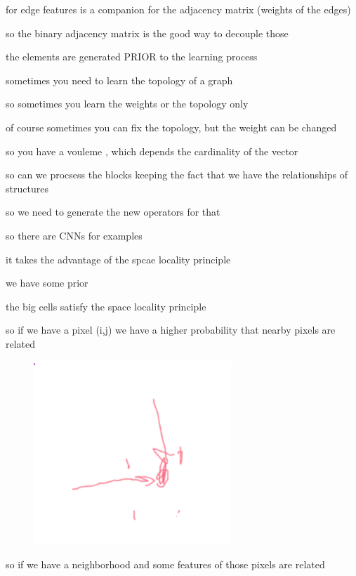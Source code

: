 \documentclass{article}
\begin{document}
for edge features is a companion for the adjacency matrix (weights of the edges)

so the binary adjacency matrix is the good way to decouple those 

the elements are generated PRIOR to the learning process

sometimes you need to learn the topology of a graph

so sometimes you learn the weights or the topology only 

of course sometimes you can fix the topology, but the weight can be changed

so you have a vouleme , which depends the cardinality of the vector

so can we procsess the blocks keeping the fact that we have the relationships of structures

so we need to generate the new operators for that


so there are CNNs for examples

it takes the advantage of the spcae locality principle

we have some prior 

the big cells satisfy the space locality principle

so if we have a pixel (i,j) we have a higher probability that nearby pixels are related

\begin{figure}
	\centering
	\includegraphics[width=0.7\linewidth]{"../imgs/concrete pixel"}
	\caption[Concrete \(i,j\) pixel selection]{}
	\label{fig:concrete-pixel}
\end{figure}


so if we have a neighborhood and some features of those pixels are related
\end{document}
